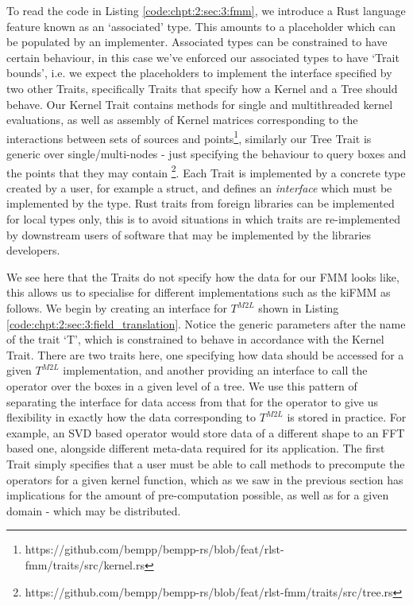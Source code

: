 To read the code in Listing \ref{code:chpt:2:sec:3:fmm}, we introduce a Rust language feature known as an `associated' type. This amounts to a placeholder which can be populated by an implementer. Associated types can be constrained to have certain behaviour, in this case we've enforced our associated types to have `Trait bounds', i.e. we expect the placeholders to implement the interface specified by two other Traits, specifically Traits that specify how a Kernel and a Tree should behave. Our Kernel Trait contains methods for single and multithreaded kernel evaluations, as well as assembly of Kernel matrices corresponding to the interactions between sets of sources and points\footnote{https://github.com/bempp/bempp-rs/blob/feat/rlst-fmm/traits/src/kernel.rs}, similarly our Tree Trait is generic over single/multi-nodes - just specifying the behaviour to query boxes and the points that they may contain \footnote{https://github.com/bempp/bempp-rs/blob/feat/rlst-fmm/traits/src/tree.rs}. Each Trait is implemented by a concrete type created by a user, for example a struct, and defines an \textit{interface} which must be implemented by the type. Rust traits from foreign libraries can be implemented for local types only, this is to avoid situations in which traits are re-implemented by downstream users of software that may be implemented by the libraries developers.

We see here that the Traits do not specify how the data for our FMM looks like, this allows us to specialise for different implementations such as the kiFMM as follows. We begin by creating an interface for $T^{M2L}$ shown in Listing \ref{code:chpt:2:sec:3:field_translation}. Notice the generic parameters after the name of the trait `T', which is constrained to behave in accordance with the Kernel Trait. There are two traits here, one specifying how data should be accessed for a given $T^{M2L}$ implementation, and another providing an interface to call the operator over the boxes in a given level of a tree. We use this pattern of separating the interface for data access from that for the operator to give us flexibility in exactly how the data corresponding to $T^{M2L}$ is stored in practice. For example, an SVD based operator would store data of a different shape to an FFT based one, alongside different meta-data required for its application. The first Trait simply specifies that a user must be able to call methods to precompute the operators for a given kernel function, which as we saw in the previous section has implications for the amount of pre-computation possible, as well as for a given domain - which may be distributed.

